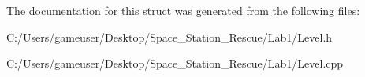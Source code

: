 The documentation for this struct was generated from the following files\+:\begin{DoxyCompactItemize}
\item 
C\+:/\+Users/gameuser/\+Desktop/\+Space\+\_\+\+Station\+\_\+\+Rescue/\+Lab1/Level.\+h\item 
C\+:/\+Users/gameuser/\+Desktop/\+Space\+\_\+\+Station\+\_\+\+Rescue/\+Lab1/Level.\+cpp\end{DoxyCompactItemize}
